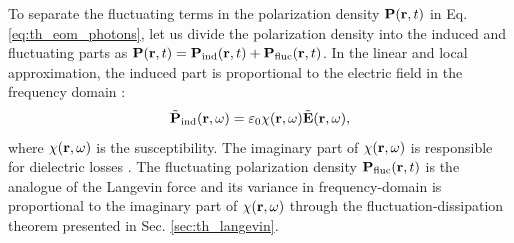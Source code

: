 

To separate the fluctuating terms in the polarization density $\mathbf{P}(\mathbf{r},t)$ in Eq. \eqref{eq:th_eom_photons}, let us divide the polarization density into the induced and fluctuating parts as $\mathbf{P}(\mathbf{r},t)=\mathbf{P}_{\textrm{ind}}(\mathbf{r},t)+ \mathbf{P}_{\textrm{fluc}}(\mathbf{r},t)$. In the linear and local approximation, the induced part is proportional to the electric field in the frequency domain \cite{novotny}:
\begin{equation}
 \tilde{\mathbf{P}}_{\textrm{ind}}(\mathbf{r},\omega)= \varepsilon_0 \chi(\mathbf{r},\omega) \tilde{\mathbf{E}}(\mathbf{r},\omega), \label{eq:th_P_chi}
\end{equation}
where $\chi(\mathbf{r},\omega)$ is the susceptibility. The imaginary part of $\chi(\mathbf{r},\omega)$ is responsible for dielectric losses \cite{jackson}. The fluctuating polarization density $\mathbf{P}_{\textrm{fluc}}(\mathbf{r},t)$ is the analogue of the Langevin force and its variance in frequency-domain is proportional to the imaginary part of $\chi(\mathbf{r},\omega)$ through the fluctuation-dissipation theorem presented in Sec. \ref{sec:th_langevin}.

